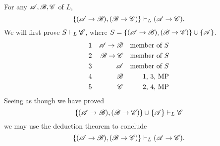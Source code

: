 \begin{corollary}
  For any \wfs{} \(\mathscr{A}, \mathscr{B}, \mathscr{C}\) of \(L\),
  \[\{(\mathscr{A} \rightarrow \mathscr{B}), (\mathscr{B} \rightarrow \mathscr{C})\} \vdash_{L} (\mathscr{A} \rightarrow \mathscr{C}).\]
  \prf{} We will first prove \(S \vdash_{L} \mathscr{C}\), where \(S = \{(\mathscr{A} \rightarrow \mathscr{B}), (\mathscr{B} \rightarrow \mathscr{C})\} \cup \{\mathscr{A}\}\).
  \begin{align*}
    \text{1}&&
    \mathscr{A} \rightarrow \mathscr{B}&&
    \text{member of \(S\)}\\
    \text{2}&&
    \mathscr{B} \rightarrow \mathscr{C}&&
    \text{member of \(S\)}\\
    \text{3}&&
    \mathscr{A}&&
    \text{member of \(S\)}\\
    \text{4}&&
    \mathscr{B}&&
    \text{1, 3, MP}\\
    \text{5}&&
    \mathscr{C}&&
    \text{2, 4, MP}
  \end{align*}
  Seeing as though we have proved
    \[\{(\mathscr{A} \rightarrow \mathscr{B}), (\mathscr{B} \rightarrow \mathscr{C})\} \cup \{\mathscr{A}\} \vdash_{L} \mathscr{C}\]
  we may use the deduction theorem to conclude
    \[\{(\mathscr{A} \rightarrow \mathscr{B}), (\mathscr{B} \rightarrow \mathscr{C})\} \vdash_{L} (\mathscr{A} \rightarrow \mathscr{C}).\]
\end{corollary}

